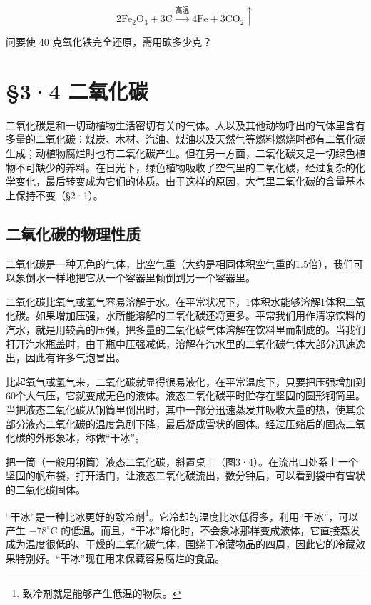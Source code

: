\[
2 \mathrm{Fe}_{2} \mathrm{O}_{3} + 3 \mathrm{C} \xrightarrow {\text{高温}} 4 \mathrm{Fe} + 3 \mathrm{CO}_{2} \uparrow
\]

问要使 40 克氧化铁完全还原，需用碳多少克？

\section{§3·4 二氧化碳}

二氧化碳是和一切动植物生活密切有关的气体。人以及其他动物呼出的气体里含有多量的二氧化碳：煤炭、木材、汽油、煤油以及天然气等燃料燃烧时都有二氧化碳生成；动植物腐烂时也有二氧化碳产生。但在另一方面，二氧化碳又是一切绿色植物不可缺少的养料。在日光下，绿色植物吸收了空气里的二氧化碳，经过复杂的化学变化，最后转变成为它们的体质。由于这样的原因，大气里二氧化碳的含量基本上保持不变（§2·1）。

\subsection{二氧化碳的物理性质}

二氧化碳是一种无色的气体，比空气重（大约是相同体积空气重的1.5倍），我们可以象倒水一样地把它从一个容器里倾倒到另一个容器里。

二氧化碳比氧气或氢气容易溶解于水。在平常状况下，1体积水能够溶解1体积二氧化碳。如果增加压强，水所能溶解的二氧化碳还将更多。平常我们用作清凉饮料的汽水，就是用较高的压强，把多量的二氧化碳气体溶解在饮料里而制成的。当我们打开汽水瓶盖时，由于瓶中压强减低，溶解在汽水里的二氧化碳气体大部分迅速逸出，因此有许多气泡冒出。

比起氧气或氢气来，二氧化碳就显得很易液化，在平常温度下，只要把压强增加到60个大气压，它就变成无色的液体。液态二氧化碳平时贮存在坚固的圆形钢筒里。当把液态二氧化碳从钢筒里倒出时，其中一部分迅速蒸发并吸收大量的热，使其余部分液态二氧化碳的温度急剧下降，最后凝成雪状的固体。经过压缩后的固态二氧化碳的外形象冰，称做``干冰''。

把一筒（一般用钢筒）液态二氧化碳，斜置桌上（图3·4）。在流出口处系上一个坚固的帆布袋，打开活门，让液态二氧化碳流出，数分钟后，可以看到袋中有雪状的二氧化碳固体。

``干冰''是一种比冰更好的致冷剂\footnote{致冷剂就是能够产生低温的物质。}。它冷却的温度比冰低得多，利用``干冰''，可以产生
\(-78^{\circ}\mathrm{C}\)
的低温。而且，``干冰''熔化时，不会象冰那样变成液体，它直接蒸发成为温度很低的、干燥的二氧化碳气体，围绕于冷藏物品的四周，因此它的冷藏效果特别好。``干冰''现在用来保藏容易腐烂的食品。

